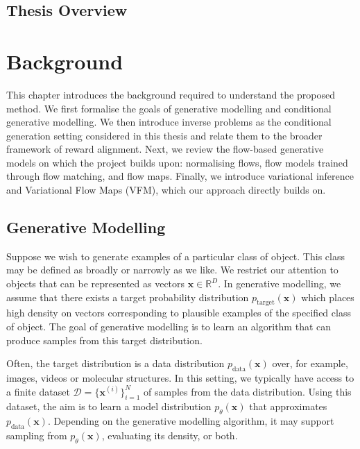 \documentclass[12pt,a4paper]{report}
\begin{document}
\section{Thesis Overview}
\label{sec:thesis_overview}



\chapter{Background}
\label{chap:background}

This chapter introduces the background required to understand the proposed method. We first formalise the goals of generative modelling and conditional generative modelling. We then introduce inverse problems as the conditional generation setting considered in this thesis and relate them to the broader framework of reward alignment. Next, we review the flow-based generative models on which the project builds upon: normalising flows, flow models trained through flow matching, and flow maps. Finally, we introduce variational inference and Variational Flow Maps (VFM), which our approach directly builds on. 

\section{Generative Modelling}
\label{sec:generative_modelling}
Suppose we wish to generate examples of a particular class of object. This class may be defined as broadly or narrowly as we like. We restrict our attention to objects that can be represented as vectors $\mathbf{x}\in\mathbb{R}^{D}$. In generative modelling, we assume that there exists a target probability distribution $p_{\mathrm{target}}(\mathbf{x})$ which places high density on vectors corresponding to plausible examples of the specified class of object. The goal of generative modelling is to learn an algorithm that can produce samples from this target distribution.

Often, the target distribution is a data distribution $p_{\mathrm{data}}(\mathbf{x})$ over, for example, images, videos or molecular structures. In this setting, we typically have access to a finite dataset $\mathcal{D}=\{\mathbf{x}^{(i)}\}_{i=1}^{N}$ of samples from the data distribution. Using this dataset, the aim is to learn a model distribution $p_{\theta}(\mathbf{x})$ that approximates $p_{\mathrm{data}}(\mathbf{x})$. Depending on the generative modelling algorithm, it may support sampling from $p_{\theta}(\mathbf{x})$, evaluating its density, or both. 
\end{document}
